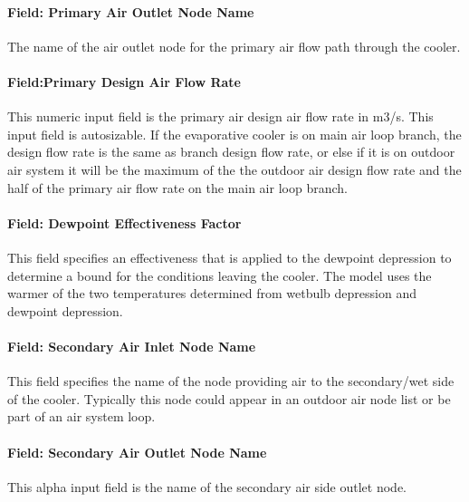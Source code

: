 \paragraph{Field: Primary Air Outlet Node Name}\label{field-primary-air-outlet-node-name-2}

The name of the air outlet node for the primary air flow path through the cooler.

\paragraph{Field:Primary Design Air Flow Rate}\label{fieldprimary-design-air-flow-rate-1}

This numeric input field is the primary air design air flow rate in m3/s. This input field is autosizable. If the evaporative cooler is on main air loop branch, the design flow rate is the same as branch design flow rate, or else if it is on outdoor air system it will be the maximum of the the outdoor air design flow rate and the half of the primary air flow rate on the main air loop branch.

\paragraph{Field: Dewpoint Effectiveness Factor}\label{field-dewpoint-effectiveness-factor}

This field specifies an effectiveness that is applied to the dewpoint depression to determine a bound for the conditions leaving the cooler. The model uses the warmer of the two temperatures determined from wetbulb depression and dewpoint depression.

\paragraph{Field: Secondary Air Inlet Node Name}\label{field-secondary-air-inlet-node-name-2}

This field specifies the name of the node providing air to the secondary/wet side of the cooler. Typically this node could appear in an outdoor air node list or be part of an air system loop.

\paragraph{Field: Secondary Air Outlet Node Name}\label{field-secondary-air-outlet-node-name}

This alpha input field is the name of the secondary air side outlet node.

